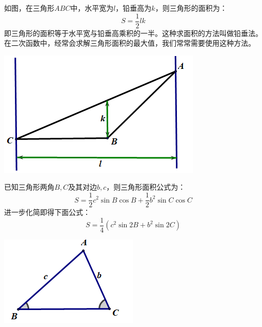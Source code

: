 \documentclass[10pt]{ctexart}
\begin{document}
\begin{minipage}[t]{0.7\textwidth}
\begin{dkyi}{}{}
如图，在三角形$ABC$中，水平宽为$l$，铅垂高为$k$，则三角形的面积为：
\[S=\dfrac{1}{2}lk\]
即三角形的面积等于水平宽与铅垂高乘积的一半。这种求面积的方法叫做铅垂法。在二次函数中，经常会求解三角形面积的最大值，我们常常需要使用这种方法。
\end{dkyi}
\end{minipage}
\begin{minipage}[t]{0.3\textwidth}
\includegraphics[scale=0.45]{figure/mj-12.png}
\end{minipage}

\begin{minipage}[t]{0.7\textwidth}
\begin{dkyi}{}{}
已知三角形两角$B,C$及其对边$b,c$，则三角形面积公式为：
\[S=\dfrac{1}{2}c^2 \sin B \cos B+\dfrac{1}{2}b^2 \sin C \cos C\]
进一步化简即得下面公式：
\[S=\dfrac{1}{4}(c^2 \sin{2B}+b^2 \sin{2C})\]
\end{dkyi}
\end{minipage}
\begin{minipage}[t]{0.3\textwidth}
\includegraphics[scale=0.6]{figure/mj-09.png}
\end{minipage}
\end{document}

